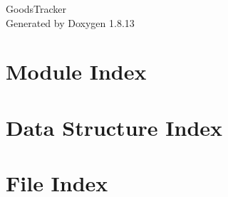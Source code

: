 \documentclass[twoside]{book}
\newcommand{\+}{\discretionary{\mbox{\scriptsize$\hookleftarrow$}}{}{}}
\newcommand{\clearemptydoublepage}{%
  \newpage{\pagestyle{empty}\cleardoublepage}%
}
\begin{document}
\hypersetup{pageanchor=false,
             bookmarksnumbered=true,
             pdfencoding=unicode
            }
\begin{titlepage}
\vspace*{7cm}
\begin{center}%
{\Large Goods\+Tracker }\\
\vspace*{1cm}
{\large Generated by Doxygen 1.8.13}\\
\end{center}
\end{titlepage}
\clearemptydoublepage
{}
\tableofcontents
\clearemptydoublepage
{}
\hypersetup{pageanchor=true}

\chapter{Module Index}

\chapter{Data Structure Index}

\chapter{File Index}

\end{document}
